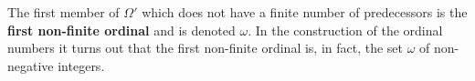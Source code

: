 The first member of $\Omega'$ which does not have a finite number of predecessors is the \textbf{first non-finite ordinal} and is denoted $\omega$. In the construction of the ordinal numbers it turns out that the first non-finite ordinal is, in fact, the set $\omega$ of non-negative integers.
